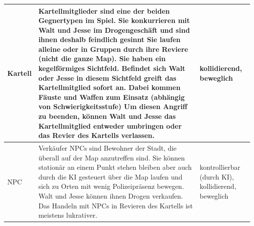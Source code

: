\begin{tabular}{|m{1.5cm}|m{13cm}|m{2.5cm}|}
    \hline
    Kartell &
    Kartellmitglieder sind eine der beiden Gegnertypen im Spiel.
    Sie konkurrieren mit Walt und Jesse im Drogengeschäft und sind ihnen deshalb feindlich gesinnt
    Sie laufen alleine oder in Gruppen durch ihre Reviere (nicht die ganze Map).
    Sie haben ein kegelförmiges Sichtfeld.
    Befindet sich Walt oder Jesse in diesem Sichtfeld greift das Kartellmitglied sofort an.
    Dabei kommen Fäuste und Waffen zum Einsatz (abhängig von Schwierigkeitsstufe)
    Um diesen Angriff zu beenden, können Walt und Jesse das Kartellmitglied entweder umbringen oder das Revier des Kartells verlassen.&
    kollidierend, beweglich\\
    \hline

    \hline
    NPC &
    Verkäufer NPCs sind Bewohner der Stadt, die überall auf der Map anzutreffen sind.
    Sie können stationär an einem Punkt stehen bleiben aber auch durch die KI gesteuert über die Map laufen und sich zu Orten mit wenig Polizeipräsenz bewegen.
    Walt und Jesse können ihnen Drogen verkaufen.
    Das Handeln mit NPCs in Revieren des Kartells ist meistens lukrativer. &
    kontrollierbar (durch KI), kollidierend, beweglich\\
    \hline

\end{tabular}
\newpage
\noindent
